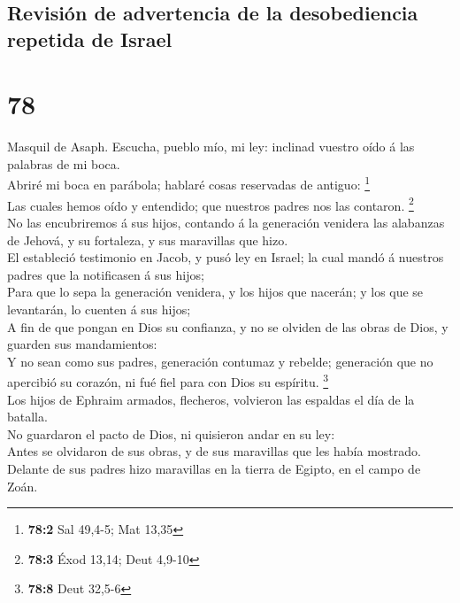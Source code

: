 \hypertarget{revisiuxf3n-de-advertencia-de-la-desobediencia-repetida-de-israel}{%
\subsection{Revisión de advertencia de la desobediencia repetida de
Israel}\label{revisiuxf3n-de-advertencia-de-la-desobediencia-repetida-de-israel}}

\hypertarget{section-77}{%
\section{78}\label{section-77}}

 Masquil de Asaph. Escucha, pueblo mío, mi ley: inclinad
vuestro oído á las palabras de mi boca.\\
 Abriré mi boca en parábola; hablaré cosas reservadas de
antiguo: \footnote{\textbf{78:2} Sal 49,4-5; Mat 13,35}\\
 Las cuales hemos oído y entendido; que nuestros padres nos
las contaron. \footnote{\textbf{78:3} Éxod 13,14; Deut 4,9-10}\\
 No las encubriremos á sus hijos, contando á la generación
venidera las alabanzas de Jehová, y su fortaleza, y sus maravillas que
hizo.\\
 El estableció testimonio en Jacob, y pusó ley en Israel; la
cual mandó á nuestros padres que la notificasen á sus hijos;\\
 Para que lo sepa la generación venidera, y los hijos que
nacerán; y los que se levantarán, lo cuenten á sus hijos;\\
 A fin de que pongan en Dios su confianza, y no se olviden
de las obras de Dios, y guarden sus mandamientos:\\
 Y no sean como sus padres, generación contumaz y rebelde;
generación que no apercibió su corazón, ni fué fiel para con Dios su
espíritu. \footnote{\textbf{78:8} Deut 32,5-6}\\
 Los hijos de Ephraim armados, flecheros, volvieron las
espaldas el día de la batalla.\\
 No guardaron el pacto de Dios, ni quisieron andar en su
ley:\\
 Antes se olvidaron de sus obras, y de sus maravillas que
les había mostrado.\\
 Delante de sus padres hizo maravillas en la tierra de
Egipto, en el campo de Zoán.\\
